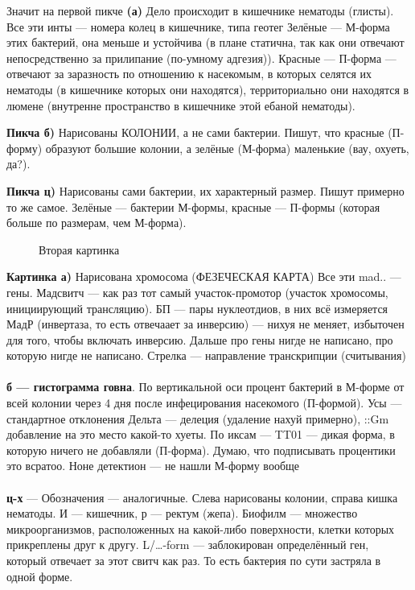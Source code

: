 Значит на первой пикче \textbf{(а)}
Дело происходит в кишечнике нематоды (глисты). Все эти инты — номера колец в кишечнике, типа геотег
Зелёные — М-форма этих бактерий, она меньше и устойчива (в плане статична, так как они отвечают непосредственно за прилипание (по-умному адгезия)). Красные — П-форма — отвечают за заразность по отношению к насекомым, в которых селятся их нематоды (в кишечнике которых они находятся), территориально они находятся в люмене (внутренне пространство в кишечнике этой ебаной нематоды).



\textbf{Пикча б)}
Нарисованы КОЛОНИИ, а не сами бактерии. Пишут, что красные (П-форму) образуют большие колонии, а зелёные (М-форма) маленькие (вау, охуеть, да?). 

\textbf{Пикча ц)}
Нарисованы сами бактерии, их характерный размер. Пишут примерно то же самое. Зелёные — бактерии М-формы, красные — П-формы (которая больше по размерам, чем М-форма).


\begin{figure}[H]\label{ul}
	\caption{Вторая картинка}
\end{figure} 

\textbf{Картинка а)}
Нарисована хромосома (ФЕЗЕЧЕСКАЯ КАРТА)
Все эти  mad..  — гены. Мадсвитч — как раз тот самый участок-промотор (участок хромосомы, инициирующий трансляцию). БП — пары нуклеотдиов, в них всё измеряется
МадР (инвертаза, то есть отвечаает за инверсию) — нихуя не меняет, избыточен для того, чтобы включать инверсию. Дальше про гены нигде не написано, про которую нигде не написано. Стрелка — направление транскрипции (считывания)
\\
\\
\textbf{б — гистограмма говна}. По вертикальной оси процент бактерий в М-форме от всей колонии через 4 дня после инфецирования насекомого (П-формой). Усы — стандартное отклонения
Дельта — делеция (удаление нахуй примерно), ::Gm добавление на это место какой-то хуеты. 
По иксам — TT01 — дикая форма, в которую ничего не добавляли (П-форма).  Думаю, что подписывать процентики это всратоо. Ноне детектион — не нашли М-форму вообще
\\
\\
\textbf{ц-х} — Обозначения — аналогичные. Слева нарисованы колонии, справа кишка нематоды. И — кишечник, р — ректум (жепа). Биофилм — множество микроорганизмов, расположенных на какой-либо поверхности, клетки которых прикреплены друг к другу. L/…-form — заблокирован определённый ген, который отвечает за этот свитч как раз. То есть бактерия по сути застряла в одной форме.


